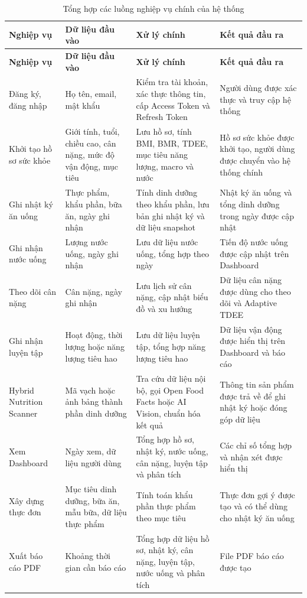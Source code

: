 \documentclass[12pt, a4paper]{report}
\begin{document}
\begin{longtable}{|>{\raggedright\arraybackslash}p{3cm}|>{\raggedright\arraybackslash}p{3cm}|>{\raggedright\arraybackslash}p{4cm}|>{\raggedright\arraybackslash}p{5cm}|}
\caption{Tổng hợp các luồng nghiệp vụ chính của hệ thống}
\label{tab:nghiep_vu_chinh} \\
\hline
\textbf{Nghiệp vụ} & \textbf{Dữ liệu đầu vào} & \textbf{Xử lý chính} & \textbf{Kết quả đầu ra} \\
\hline
\endfirsthead
\hline
\textbf{Nghiệp vụ} & \textbf{Dữ liệu đầu vào} & \textbf{Xử lý chính} & \textbf{Kết quả đầu ra} \\
\hline
\endhead

Đăng ký, đăng nhập & Họ tên, email, mật khẩu & Kiểm tra tài khoản, xác thực thông tin, cấp Access Token và Refresh Token & Người dùng được xác thực và truy cập hệ thống \\
\hline
Khởi tạo hồ sơ sức khỏe & Giới tính, tuổi, chiều cao, cân nặng, mức độ vận động, mục tiêu & Lưu hồ sơ, tính BMI, BMR, TDEE, mục tiêu năng lượng, macro và nước & Hồ sơ sức khỏe được khởi tạo, người dùng được chuyển vào hệ thống chính \\
\hline
Ghi nhật ký ăn uống & Thực phẩm, khẩu phần, bữa ăn, ngày ghi nhận & Tính dinh dưỡng theo khẩu phần, lưu bản ghi nhật ký và dữ liệu snapshot & Nhật ký ăn uống và tổng dinh dưỡng trong ngày được cập nhật \\
\hline
Ghi nhận nước uống & Lượng nước uống, ngày ghi nhận & Lưu dữ liệu nước uống, tổng hợp theo ngày & Tiến độ nước uống được cập nhật trên Dashboard \\
\hline
Theo dõi cân nặng & Cân nặng, ngày ghi nhận & Lưu lịch sử cân nặng, cập nhật biểu đồ và xu hướng & Dữ liệu cân nặng được dùng cho theo dõi và Adaptive TDEE \\
\hline
Ghi nhận luyện tập & Hoạt động, thời lượng hoặc năng lượng tiêu hao & Lưu dữ liệu luyện tập, tổng hợp năng lượng tiêu hao & Dữ liệu vận động được hiển thị trên Dashboard và báo cáo \\
\hline
Hybrid Nutrition Scanner & Mã vạch hoặc ảnh bảng thành phần dinh dưỡng & Tra cứu dữ liệu nội bộ, gọi Open Food Facts hoặc AI Vision, chuẩn hóa kết quả & Thông tin sản phẩm được trả về để ghi nhật ký hoặc đóng góp dữ liệu \\
\hline
Xem Dashboard & Ngày xem, dữ liệu người dùng & Tổng hợp hồ sơ, nhật ký, nước uống, cân nặng, luyện tập và phân tích & Các chỉ số tổng hợp và nhận xét được hiển thị \\
\hline
Xây dựng thực đơn & Mục tiêu dinh dưỡng, bữa ăn, mẫu bữa, dữ liệu thực phẩm & Tính toán khẩu phần thực phẩm theo mục tiêu & Thực đơn gợi ý được tạo và có thể dùng cho nhật ký ăn uống \\
\hline
Xuất báo cáo PDF & Khoảng thời gian cần báo cáo & Tổng hợp dữ liệu hồ sơ, nhật ký, cân nặng, luyện tập, nước uống và phân tích & File PDF báo cáo được tạo \\
\hline
\end{longtable}
\end{document}
